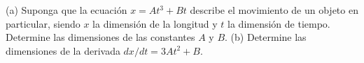 \item (a) Suponga que la ecuación $x = At^3 + Bt$ describe el movimiento de un objeto en particular, siendo $x$ la dimensión de la longitud y $t$ la dimensión de tiempo. Determine las dimensiones de las constantes $A$ y $B$. (b) Determine las dimensiones de la derivada $dx/dt = 3At^2 + B$.
